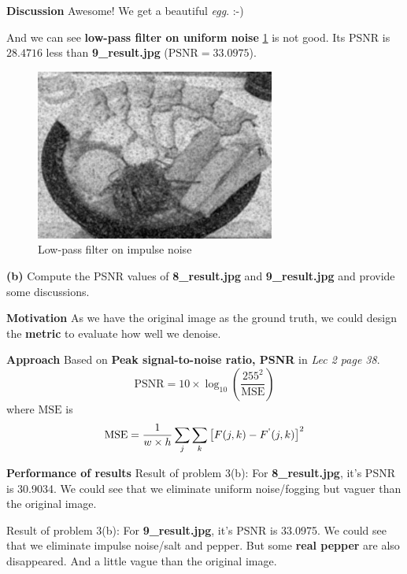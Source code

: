 \textbf{Discussion}
Awesome! We get a beautiful \textit{egg}. :-)

And we can see \textbf{low-pass filter on uniform noise} \cref{fig3a_2l} is not good. Its PSNR is $28.4716$ less than \textbf{9\_result.jpg} ($\mbox{PSNR}=33.0975$).
\begin{figure}
  \centering
  \includegraphics[width=0.7\textwidth]{image/tmp/9_result_low_pass.jpg}
  \caption{Low-pass filter on impulse noise}
  \label{fig3a_2l}
\end{figure}

\textbf{(b)} Compute the PSNR values of \textbf{8\_result.jpg} and \textbf{9\_result.jpg} and provide some discussions.

\textbf{Motivation}
As we have the original image as the \alert{ground truth}, we could design the \textbf{metric} to evaluate how well we denoise. 

\textbf{Approach}
Based on \textbf{Peak signal-to-noise ratio, PSNR} in \textit{Lec 2 page 38}.
\begin{equation}
\mbox{PSNR} = 10 \times \log_{10} \left(\frac{255^{2}}{\mbox{MSE}}\right)
\end{equation}
where \(\mbox{MSE}\) is
\begin{equation}
\mbox{MSE} = \frac{1}{w \times h}\sum_{j}\sum_{k}\left[F(j, k) - F^{\textnormal{\textquotesingle}}(j, k) \right]^{2}
\end{equation}

\textbf{Performance of results}
Result of problem 3(b): For \textbf{8\_result.jpg}, it's PSNR is \alert{30.9034}.
We could see that we eliminate uniform noise/fogging but vaguer than the original image.

Result of problem 3(b): For \textbf{9\_result.jpg}, it's PSNR is \alert{33.0975}.
We could see that we eliminate impulse noise/salt and pepper. But some \textbf{real pepper} are also disappeared. And a little vague than the original image.

